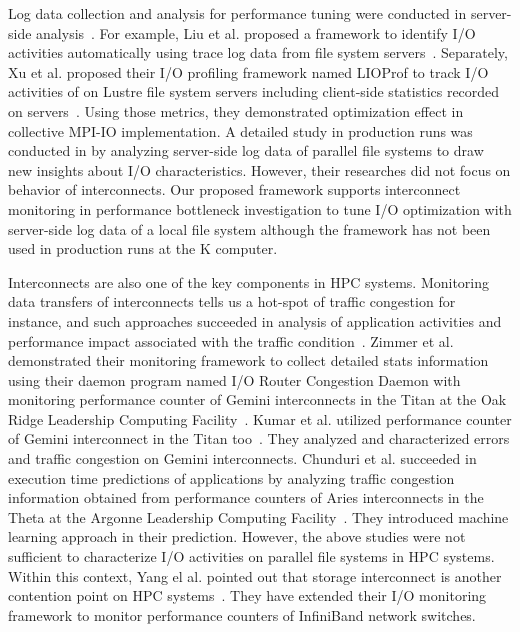 \documentclass{jhps}
\begin{document}
Log data collection and analysis for performance tuning were conducted in
server-side analysis~\cite{liu:fast2014,liu:sc16,xu:cug16,patel:sc19}.
For example, Liu et al. proposed a framework to identify I/O activities
automatically using trace log data from file system servers~\cite{liu:fast2014,liu:sc16}.
Separately, Xu et al. proposed their I/O profiling framework
named LIOProf to track I/O activities of on Lustre file system servers
including client-side statistics recorded on servers~\cite{xu:cug16}.
Using those metrics, they demonstrated optimization effect
in collective MPI-IO implementation.
A detailed study in production runs was conducted in \cite{patel:sc19}
by analyzing server-side log data of parallel file systems
to draw new insights about I/O characteristics.
However, their researches did not focus on behavior of interconnects.
Our proposed framework supports interconnect monitoring
in performance bottleneck investigation to tune I/O optimization
with server-side log data of a local file system
although the framework has not been used in production runs at the K computer.

Interconnects are also one of the key components in HPC systems.
Monitoring data transfers of interconnects tells us a hot-spot of traffic congestion
for instance, and such approaches succeeded in analysis of
application activities and performance impact associated with
the traffic condition~\cite{zimmer:cug16,kumar:DSN2018,chunduri:pmbs19,yang:nsdi2019}.
Zimmer et al. demonstrated their monitoring framework to collect detailed stats information
using their daemon program named I/O Router Congestion Daemon with monitoring
performance counter of Gemini interconnects in the Titan at the Oak Ridge Leadership
Computing Facility~\cite{zimmer:cug16}.
Kumar et al. utilized performance counter of Gemini interconnect
in the Titan too~\cite{kumar:DSN2018}.
They analyzed and characterized errors and traffic congestion on Gemini interconnects.
Chunduri et al. succeeded in execution time predictions
of applications by analyzing traffic congestion information
obtained from performance counters of Aries interconnects in the Theta
at the Argonne Leadership Computing Facility~\cite{chunduri:pmbs19}.
They introduced machine learning approach in their prediction.
However, the above studies were not sufficient to characterize I/O activities
on parallel file systems in HPC systems.
Within this context, Yang el al. pointed out that storage interconnect is
another contention point on HPC systems~\cite{yang:nsdi2019}.
They have extended their I/O monitoring framework to monitor performance counters
of InfiniBand network switches.
\end{document}

